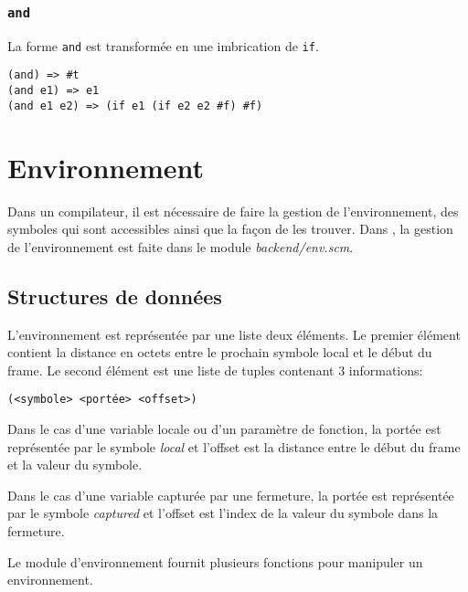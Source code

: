 \documentclass[11pt]{report}
\begin{document}
\subsection{\tt and}

La forme {\tt and} est transformée en une imbrication de {\tt if}.


\begin{verbatim}
(and) => #t
(and e1) => e1
(and e1 e2) => (if e1 (if e2 e2 #f) #f)
\end{verbatim}



\chapter{Environnement}

Dans un compilateur, il est nécessaire de faire la gestion de
l'environnement, des symboles qui sont accessibles ainsi que la façon
de les trouver.  Dans \sins{}, la gestion de l'environnement est
faite dans le module {\it backend/env.scm}.

\section{Structures de données}

L'environnement est représentée par une liste deux éléments. Le
premier élément contient la distance en octets entre le prochain
symbole local et le début du frame.  Le second élément est une liste
de tuples contenant 3 informations:


\begin{verbatim}
(<symbole> <portée> <offset>)
\end{verbatim}

Dans le cas d'une variable locale ou d'un paramètre de fonction, la
portée est représentée par le symbole {\it local} et l'offset est la
distance entre le début du frame et la valeur du symbole.

Dans le cas d'une variable capturée par une fermeture, la portée est
représentée par le symbole {\it captured} et l'offset est l'index de
la valeur du symbole dans la fermeture.

Le module d'environnement fournit plusieurs fonctions pour manipuler
un environnement.
\end{document}
